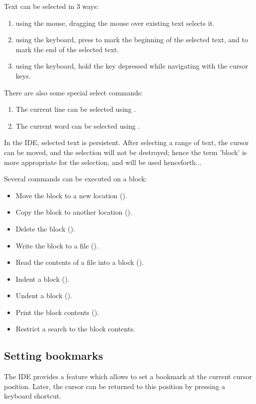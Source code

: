 Text can be selected in 3 ways:
\begin{enumerate}
\item using the mouse, dragging the mouse over existing text selects it.
\item using the keyboard, press  to mark the beginning of
the selected text, and  to mark the end of the selected
text.
\item using the keyboard, hold the  key depressed while
navigating with the cursor keys.
\end{enumerate}

There are also some special select commands:
\begin{enumerate}
\item The current line can be selected using .
\item The current word can be selected using .
\end{enumerate}

In the \fpc IDE, selected text is persistent. After selecting a range of 
text, the cursor can be moved, and the selection will not be destroyed;
hence the term 'block' is more appropriate for the selection, and will be
used henceforth...

Several commands can be executed on a block:
\begin{itemize}
\item Move the block to a new location ().
\item Copy the block to another location ().
\item Delete the block ().
\item Write the block to a file ().
\item Read the contents of a file into a block ().
\item Indent a block ().
\item Undent a block ().
\item Print the block contents ().
\item Restrict a search to the block contents.
\end{itemize}

%
%
\subsection{Setting bookmarks}
\label{se:bookmarks}
The IDE provides a feature which allows to set a bookmark at the current 
cursor position. Later, the cursor can be returned to this position 
by pressing a keyboard shortcut.

